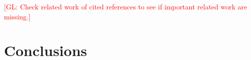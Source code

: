 \documentclass[twocolumn,superscriptaddress,aps]{revtex4-1}
\newcommand{\glnote}[1]{\textcolor{red}{[GL: #1]}}
\theoremstyle{plain}
\begin{document}
\glnote{Check related work of cited references to see if important related work are missing.}



\section{Conclusions}



\begin{acknowledgments}
\end{acknowledgments}




\end{document}
